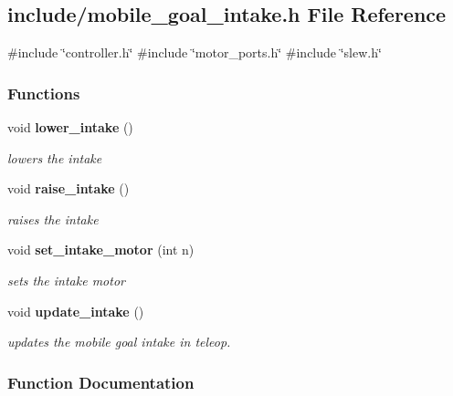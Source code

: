 \subsection{include/mobile\+\_\+goal\+\_\+intake.h File Reference}
\label{mobile__goal__intake_8h}
{\ttfamily \#include \char`\"{}controller.\+h\char`\"{}}\newline
{\ttfamily \#include \char`\"{}motor\+\_\+ports.\+h\char`\"{}}\newline
{\ttfamily \#include \char`\"{}slew.\+h\char`\"{}}\newline
\subsubsection*{Functions}
\begin{DoxyCompactItemize}
\item 
void \textbf{ lower\+\_\+intake} ()
\begin{DoxyCompactList}\small\item\em lowers the intake \end{DoxyCompactList}\item 
void \textbf{ raise\+\_\+intake} ()
\begin{DoxyCompactList}\small\item\em raises the intake \end{DoxyCompactList}\item 
void \textbf{ set\+\_\+intake\+\_\+motor} (int n)
\begin{DoxyCompactList}\small\item\em sets the intake motor \end{DoxyCompactList}\item 
void \textbf{ update\+\_\+intake} ()
\begin{DoxyCompactList}\small\item\em updates the mobile goal intake in teleop. \end{DoxyCompactList}\end{DoxyCompactItemize}


\subsubsection{Function Documentation}
\mbox{\label{mobile__goal__intake_8h_aef03134014e51a6a90dd3824f09f4d6c}} 
